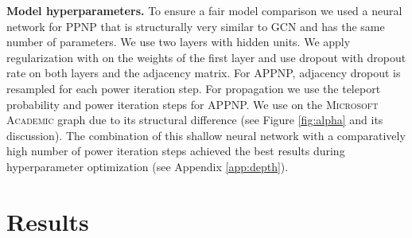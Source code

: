 \documentclass{article} \usepackage{iclr2019_conference,times}
\begin{document}
\textbf{Model hyperparameters.} To ensure a fair model comparison we used a neural network for PPNP that is structurally very similar to GCN and has the same number of parameters. We use two layers with  hidden units. We apply  regularization with  on the weights of the first layer and use dropout with dropout rate  on both layers and the adjacency matrix. For APPNP, adjacency dropout is resampled for each power iteration step. For propagation we use the teleport probability  and  power iteration steps for APPNP. We use  on the \textsc{Microsoft Academic} graph due to its structural difference (see Figure \ref{fig:alpha} and its discussion). The combination of this shallow neural network with a comparatively high number of power iteration steps achieved the best results during hyperparameter optimization (see Appendix \ref{app:depth}).

\section{Results} \label{sec:results}
\end{document}
